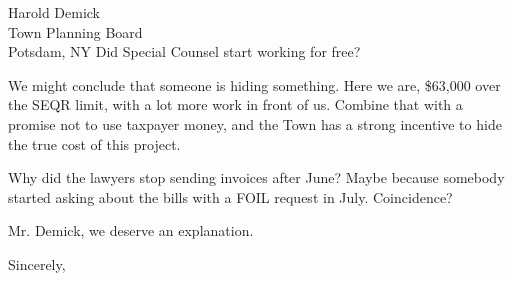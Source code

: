 \documentclass[12pt]{letter}
\begin{document}
\begin{letter}{Harold Demick\\Town Planning Board\\Potsdam, NY}
Did Special Counsel start working for free?

We might conclude that someone is hiding something.  Here we are, \$63,000 over the SEQR limit, with a lot more work in front of us.  Combine that with a promise not to use taxpayer money, and the Town has a strong incentive to hide the true cost of this project.

Why did the lawyers stop sending invoices after June?  Maybe because somebody started asking about the bills with a FOIL request in July.  Coincidence?

Mr. Demick, we deserve an explanation.

\closing{Sincerely,}


\end{letter}
\end{document}
